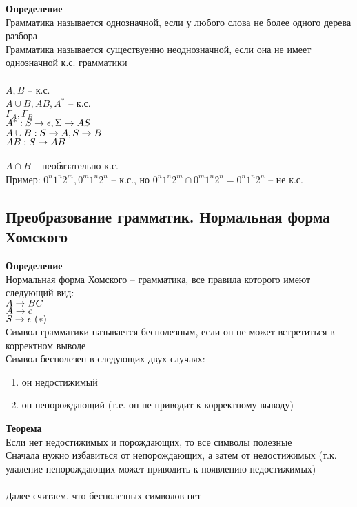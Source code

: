 \documentclass[12pt]{article}
\begin{document}
\textbf{Определение}\\
Грамматика называется однозначной, если у любого слова не более одного дерева разбора\\
Грамматика называется существуенно неоднозначной, если она не имеет однозначной к.с. грамматики\\\\
$A, B$ -- к.с.\\
$A\cup B, AB, A^*$ -- к.с.\\
$\Gamma_A, \Gamma_B$\\
$A^*: S\rightarrow \epsilon, \Sigma\rightarrow AS$\\
$A\cup B: S\rightarrow A, S\rightarrow B$\\
$AB: S\rightarrow AB$\\\\
$A \cap B$ -- необязательно к.с.\\
Пример: $0^n1^n2^m, 0^m1^n2^n$ -- к.с., но $0^n1^n2^m\cap 0^m1^n2^n = 0^n1^n2^n$ -- не к.с.\\
\subsection{Преобразование грамматик. Нормальная форма Хомского}
\textbf{Определение}\\
Нормальная форма Хомского -- грамматика, все правила которого имеют следующий вид:\\
$A \rightarrow BC$\\
$A \rightarrow c$\\
$S \rightarrow \epsilon\ (*)$\\
Символ грамматики называется бесполезным, если он не может встретиться в корректном выводе\\
Символ бесполезен в следующих двух случаях:
\begin{enumerate}
    \item он недостижимый
    \item он непорождающий (т.е. он не приводит к корректному выводу)
\end{enumerate}
\textbf{Теорема}\\
Если нет недостижимых и порождающих, то все символы полезные\\
Сначала нужно избавиться от непорождающих, а затем от недостижимых (т.к. удаление непорождающих может приводить к появлению недостижимых)\\\\
Далее считаем, что бесполезных символов нет
\end{document}
